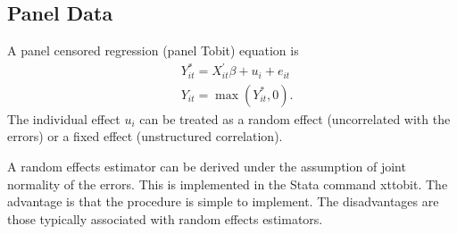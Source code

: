 \documentclass[10pt]{article}
\begin{document}
\subsection{Panel Data}
A panel censored regression (panel Tobit) equation is
$$
\begin{aligned}
&Y_{i t}^{*}=X_{i t}^{\prime} \beta+u_{i}+e_{i t} \\
&Y_{i t}=\max \left(Y_{i t}^{*}, 0\right) .
\end{aligned}
$$
The individual effect $u_{i}$ can be treated as a random effect (uncorrelated with the errors) or a fixed effect (unstructured correlation).

A random effects estimator can be derived under the assumption of joint normality of the errors. This is implemented in the Stata command xttobit. The advantage is that the procedure is simple to implement. The disadvantages are those typically associated with random effects estimators.
\end{document}
